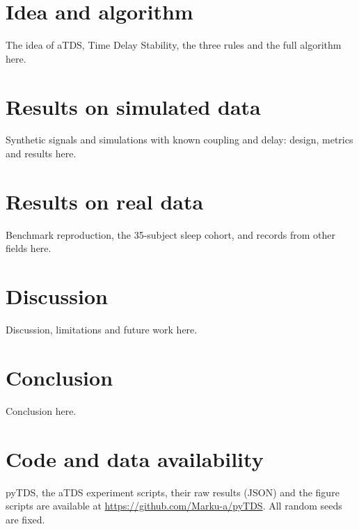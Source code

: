 \documentclass[11pt,a4paper]{article}
\begin{document}
\section{Idea and algorithm}
\label{sec:method}
The idea of aTDS, Time Delay Stability, the three rules and the full algorithm here.

\section{Results on simulated data}
\label{sec:simulation}
Synthetic signals and simulations with known coupling and delay: design, metrics and results here.

\section{Results on real data}
\label{sec:realdata}
Benchmark reproduction, the 35-subject sleep cohort, and records from other fields here.

\section{Discussion}
\label{sec:discussion}
Discussion, limitations and future work here.

\section{Conclusion}
\label{sec:conclusion}
Conclusion here.

\section*{Code and data availability}
pyTDS, the aTDS experiment scripts, their raw results (JSON) and the figure scripts are available at \url{https://github.com/Marku-a/pyTDS}. All random seeds are fixed.




\end{document}
